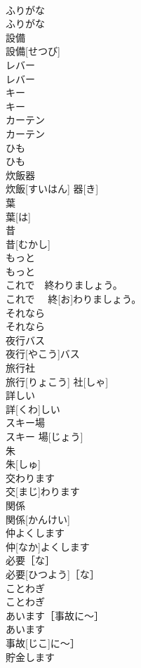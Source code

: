 \documentclass[8pt]{extreport}
\begin{document}
\begin{CJK}{UTF8}{min}
\\	ふりがな	
\\	ふりがな	
\\	設備	
\\	設備[せつび]	
\\	レバー	
\\	レバー	
\\	キー	
\\	キー	
\\	カーテン	
\\	カーテン	
\\	ひも	
\\	ひも	
\\	炊飯器	
\\	炊飯[すいはん] 器[き]	
\\	葉	
\\	葉[は]	
\\	昔	
\\	昔[むかし]	
\\	もっと	
\\	もっと	
\\	これで　終わりましょう。	
\\	これで　 終[お]わりましょう。	
\\	それなら	
\\	それなら	
\\	夜行バス	
\\	夜行[やこう]バス	
\\	旅行社	
\\	旅行[りょこう] 社[しゃ]	
\\	詳しい	
\\	詳[くわ]しい	
\\	スキー場	
\\	スキー 場[じょう]	
\\	朱	
\\	朱[しゅ]	
\\	交わります	
\\	交[まじ]わります	
\\	関係	
\\	関係[かんけい]	
\\	仲よくします	
\\	仲[なか]よくします	
\\	必要［な］	
\\	必要[ひつよう]［な］	
\\	ことわぎ	
\\	ことわぎ	
\\	あいます［事故に〜］	
\\	あいます
\\	事故[じこ]に〜］	
\\	貯金します	

\end{CJK}
\end{document}
